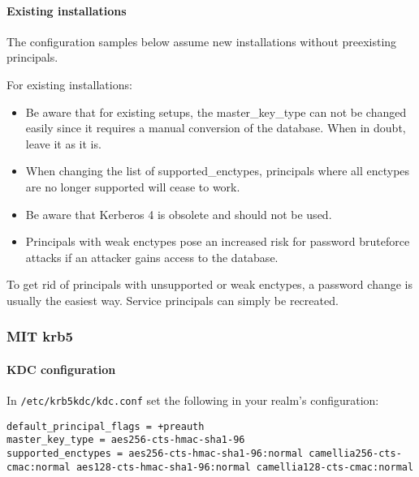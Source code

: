 
\paragraph{Existing installations}

The configuration samples below assume new installations without preexisting principals.

For existing installations:
\begin{itemize}
	\item Be aware that for existing setups, the master\_key\_type can not be changed easily since it requires a manual conversion of the database. When in doubt, leave it as it is. 
	\item When changing the list of supported\_enctypes, principals where all enctypes are no longer supported will cease to work.
	\item Be aware that Kerberos 4 is obsolete and should not be used.
	\item Principals with weak enctypes pose an increased risk for password bruteforce attacks if an attacker gains access to the database.
\end{itemize}

To get rid of principals with unsupported or weak enctypes, a password change is usually the easiest way. Service principals can simply be recreated. 

\subsubsection{MIT krb5}

\paragraph{KDC configuration}
In \verb#/etc/krb5kdc/kdc.conf# set the following in your realm's configuration:
\begin{lstlisting}[breaklines]
default_principal_flags = +preauth
master_key_type = aes256-cts-hmac-sha1-96
supported_enctypes = aes256-cts-hmac-sha1-96:normal camellia256-cts-cmac:normal aes128-cts-hmac-sha1-96:normal camellia128-cts-cmac:normal
\end{lstlisting}

